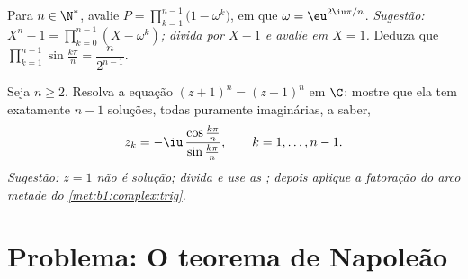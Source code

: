 \begin{exercise}[$\star\star\star$]\label{exo:b1:complex:11}
Para $n \in \N^*$, avalie $P = \prod_{k=1}^{n-1}
\bigl(1 - \omega^k\bigr)$, em que $\omega = \eu^{2\iu\pi/n}$.
\emph{Sugestão: $X^n - 1 = \prod_{k=0}^{n-1} (X - \omega^k)$; divida por
$X - 1$ e avalie em $X = 1$.} Deduza que
$\prod_{k=1}^{n-1} \sin\frac{k\pi}{n} = \dfrac{n}{2^{n-1}}$.
\end{exercise}

\begin{exercise}[$\star\star$]\label{exo:b1:complex:12}
Seja $n \geq 2$. Resolva a equação $(z + 1)^n = (z - 1)^n$ em $\C$:
mostre que ela tem exatamente $n - 1$ soluções, todas puramente
imaginárias, a saber,
\[
z_k = -\iu\,\frac{\cos\frac{k\pi}{n}}{\sin\frac{k\pi}{n}},
\qquad k = 1, \dots, n - 1 .
\]
\emph{Sugestão: $z = 1$ não é solução; divida e use as ; depois aplique a fatoração do arco metade do
\cref{met:b1:complex:trig}.}
\end{exercise}

\section{Problema: O teorema de Napoleão}

